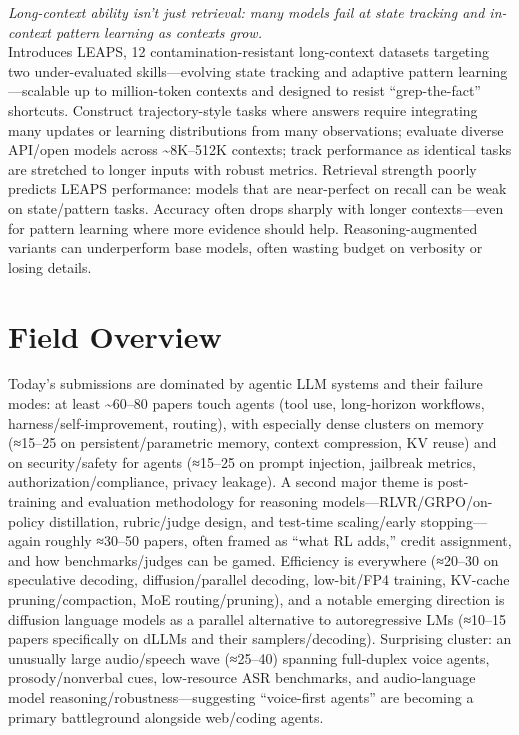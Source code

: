 \documentclass[12pt,letterpaper]{article}
\begin{document}
{\small\textit{Long-context ability isn't just retrieval: many models fail at state tracking and in-context pattern learning as contexts grow.}}\\[1pt]
{\footnotesize Introduces LEAPS, 12 contamination-resistant long-context datasets targeting two under-evaluated skills---evolving state tracking and adaptive pattern learning---scalable up to million-token contexts and designed to resist ``grep-the-fact'' shortcuts. Construct trajectory-style tasks where answers require integrating many updates or learning distributions from many observations; evaluate diverse API/open models across \textasciitilde{}8K--512K contexts; track performance as identical tasks are stretched to longer inputs with robust metrics. Retrieval strength poorly predicts LEAPS performance: models that are near-perfect on recall can be weak on state/pattern tasks. Accuracy often drops sharply with longer contexts---even for pattern learning where more evidence should help. Reasoning-augmented variants can underperform base models, often wasting budget on verbosity or losing details.}

\medskip



\section*{Field Overview}
{\footnotesize Today's submissions are dominated by agentic LLM systems and their failure modes: at least \textasciitilde{}60--80 papers touch agents (tool use, long-horizon workflows, harness/self-improvement, routing), with especially dense clusters on memory (≈15--25 on persistent/parametric memory, context compression, KV reuse) and on security/safety for agents (≈15--25 on prompt injection, jailbreak metrics, authorization/compliance, privacy leakage). A second major theme is post-training and evaluation methodology for reasoning models---RLVR/GRPO/on-policy distillation, rubric/judge design, and test-time scaling/early stopping---again roughly ≈30--50 papers, often framed as ``what RL adds,'' credit assignment, and how benchmarks/judges can be gamed. Efficiency is everywhere (≈20--30 on speculative decoding, diffusion/parallel decoding, low-bit/FP4 training, KV-cache pruning/compaction, MoE routing/pruning), and a notable emerging direction is diffusion language models as a parallel alternative to autoregressive LMs (≈10--15 papers specifically on dLLMs and their samplers/decoding). Surprising cluster: an unusually large audio/speech wave (≈25--40) spanning full-duplex voice agents, prosody/nonverbal cues, low-resource ASR benchmarks, and audio-language model reasoning/robustness---suggesting ``voice-first agents'' are becoming a primary battleground alongside web/coding agents.}
\end{document}
